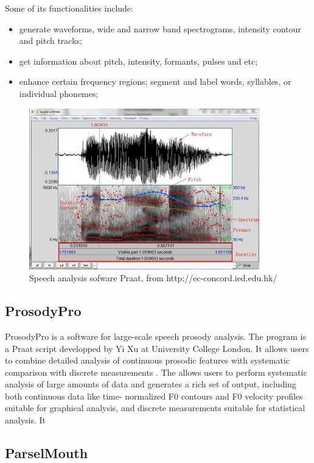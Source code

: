 Some of its functionalities include:
\begin{itemize}
    \item generate waveforms, wide and narrow band spectrograms, intensity contour and pitch tracks;
    \item get information about pitch, intensity, formants, pulses and etc;
    \item enhance certain frequency regions; segment and label words, syllables, or individual phonemes;
\end{itemize}

\begin{figure}[ht]
\center
\includegraphics[width=10cm, scale=0.7]{figures/Praat.jpg}
\caption{Speech analysis sofware Praat, from http://ec-concord.ied.edu.hk/}
\label{fig:praat}
\end{figure}

\subsection{ProsodyPro}
ProsodyPro is a software for large-scale speech prosody analysis. The program is a Praat script developped by Yi Xu at University College London. It allows users to combine detailed analysis of continuous prosodic features with systematic comparison with discrete measurements . The
allows users to perform systematic analysis of large amounts of data and generates a rich set of output, including both continuous data like time- normalized F0
contours and F0 velocity profiles suitable for
graphical analysis, and discrete measurements suitable for statistical analysis. It

\subsection{ParselMouth}


